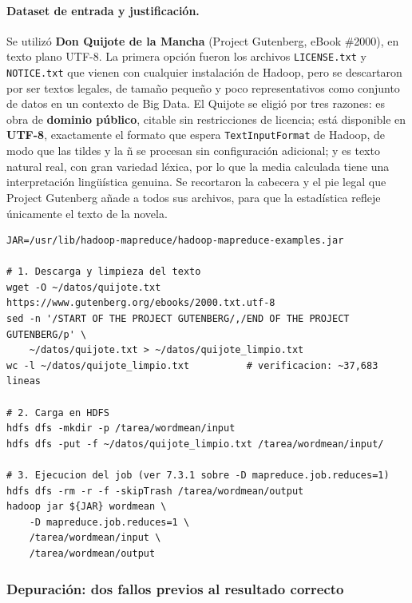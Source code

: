 \paragraph{Dataset de entrada y justificación.} Se utilizó \textbf{\guillemotleft{}Don Quijote de la Mancha\guillemotright{}} (Project Gutenberg, eBook \#2000), en texto plano UTF-8. La primera opción fueron los archivos \texttt{LICENSE.txt} y \texttt{NOTICE.txt} que vienen con cualquier instalación de Hadoop, pero se descartaron por ser textos legales, de tamaño pequeño y poco representativos como conjunto de datos en un contexto de Big Data. El Quijote se eligió por tres razones: es obra de \textbf{dominio público}, citable sin restricciones de licencia; está disponible en \textbf{UTF-8}, exactamente el formato que espera \texttt{TextInputFormat} de Hadoop, de modo que las tildes y la \guillemotleft{}ñ\guillemotright{} se procesan sin configuración adicional; y es texto natural real, con gran variedad léxica, por lo que la media calculada tiene una interpretación lingüística genuina. Se recortaron la cabecera y el pie legal que Project Gutenberg añade a todos sus archivos, para que la estadística refleje únicamente el texto de la novela.

\begin{lstlisting}[style=sh]
JAR=/usr/lib/hadoop-mapreduce/hadoop-mapreduce-examples.jar

# 1. Descarga y limpieza del texto
wget -O ~/datos/quijote.txt https://www.gutenberg.org/ebooks/2000.txt.utf-8
sed -n '/START OF THE PROJECT GUTENBERG/,/END OF THE PROJECT GUTENBERG/p' \
    ~/datos/quijote.txt > ~/datos/quijote_limpio.txt
wc -l ~/datos/quijote_limpio.txt          # verificacion: ~37,683 lineas

# 2. Carga en HDFS
hdfs dfs -mkdir -p /tarea/wordmean/input
hdfs dfs -put -f ~/datos/quijote_limpio.txt /tarea/wordmean/input/

# 3. Ejecucion del job (ver 7.3.1 sobre -D mapreduce.job.reduces=1)
hdfs dfs -rm -r -f -skipTrash /tarea/wordmean/output
hadoop jar ${JAR} wordmean \
    -D mapreduce.job.reduces=1 \
    /tarea/wordmean/input \
    /tarea/wordmean/output
\end{lstlisting}


\subsubsection{Depuración: dos fallos previos al resultado correcto}
\label{subsubsec:wordmean-fallos}

